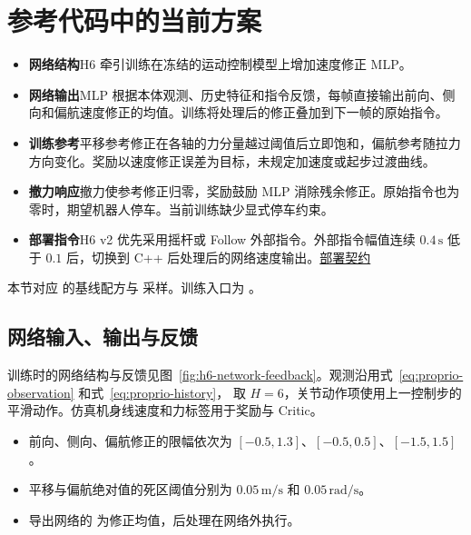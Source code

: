 \section{参考代码中的当前方案}

\begin{itemize}
  \item \textbf{网络结构}\enspace H6 牵引训练在冻结的运动控制模型上增加速度修正 MLP。
  \item \textbf{网络输出}\enspace MLP 根据本体观测、历史特征和指令反馈，每帧直接输出前向、侧向和偏航速度修正的均值。训练将处理后的修正叠加到下一帧的原始指令。
  \item \textbf{训练参考}\enspace 平移参考修正在各轴的力分量越过阈值后立即饱和，偏航参考随拉力方向变化。奖励以速度修正误差为目标，未规定加速度或起步过渡曲线。
  \item \textbf{撤力响应}\enspace 撤力使参考修正归零，奖励鼓励 MLP 消除残余修正。原始指令也为零时，期望机器人停车。当前训练缺少显式停车约束。
  \item \textbf{部署指令}\enspace H6 v2 优先采用摇杆或 Follow 外部指令。外部指令幅值连续 $0.4\,\mathrm{s}$ 低于 $0.1$ 后，切换到 C++ 后处理后的网络速度输出。\href{https://github.com/VitaDynamics/cerebrix/blob/57a05ee00d229da6fd6f10defcc51e947247d6c6/source/cerebrix/cerebrix/rl/traction/contracts/deployment_h6_v2/deployment_contract.json\#L57}{部署契约}
\end{itemize}

本节对应  的基线配方与  采样。训练入口为 。

\subsection{网络输入、输出与反馈}

训练时的网络结构与反馈见图~\ref{fig:h6-network-feedback}。观测沿用式~\eqref{eq:proprio-observation} 和式~\eqref{eq:proprio-history}，
取 $H=6$，关节动作项使用上一控制步的平滑动作。仿真机身线速度和力标签用于奖励与 Critic。

\begin{itemize}
  \item 前向、侧向、偏航修正的限幅依次为 $[-0.5,1.3]$、$[-0.5,0.5]$、$[-1.5,1.5]$。
  \item 平移与偏航绝对值的死区阈值分别为 $0.05\,\mathrm{m/s}$ 和 $0.05\,\mathrm{rad/s}$。
  \item 导出网络的  为修正均值，后处理在网络外执行。
\end{itemize}

